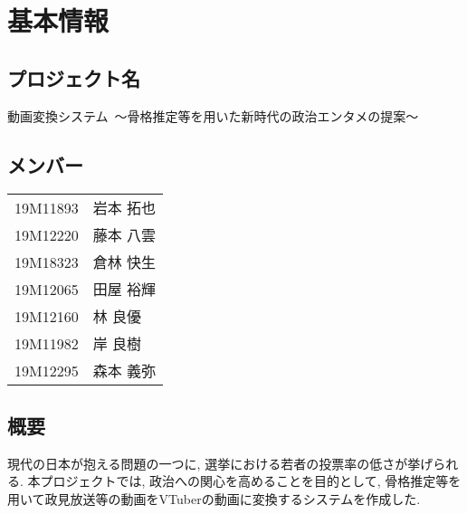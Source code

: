 \documentclass[a4paper,12pt]{jsarticle}
\title{}
\author{}
\date{}
\begin{document}
\section{基本情報}
\subsection{プロジェクト名}
{\large 動画変換システム\ 〜骨格推定等を用いた新時代の政治エンタメの提案〜}

\subsection{メンバー}
\begin{table}[H]
    \begin{tabular}{cl}
        19M11893 & 岩本 拓也\\
        19M12220 & 藤本 八雲\\
        19M18323 & 倉林 快生\\
        19M12065 & 田屋 裕輝\\
        19M12160 & 林 良優\\
        19M11982 & 岸 良樹\\
        19M12295 & 森本 義弥
	\end{tabular}
\end{table}

\subsection{概要}

現代の日本が抱える問題の一つに, 選挙における若者の投票率の低さが挙げられる.
本プロジェクトでは, 政治への関心を高めることを目的として, 骨格推定等を用いて政見放送等の動画をVTuberの動画に変換するシステムを作成した.

\begin{comment}

\begin{figure}[H]
	\begin{center}
		\begin{tabular}{c}
			\begin{minipage}{0.50\hsize}
				\centering
				\texttt{[image: slide1]}
				\caption{}
				\label{}
			\end{minipage}

			\begin{minipage}{0.50\hsize}
				\centering
				\texttt{[image: slide2]}
				\caption{}
				\label{}
			\end{minipage}
		\end{tabular}
		\label{}
	\end{center}
\end{figure}

\end{comment}
\end{document}
